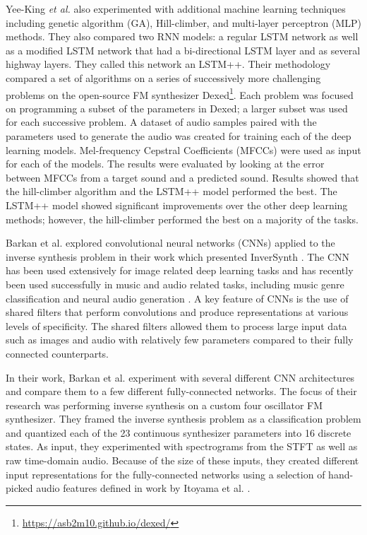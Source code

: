 Yee-King \textit{et al.} also experimented with additional machine learning techniques including genetic algorithm (GA), Hill-climber, and  multi-layer perceptron (MLP) methods. They also compared two RNN models: a regular LSTM network as well as a modified LSTM network that had a bi-directional LSTM layer and as several highway layers. They called this network an LSTM++. Their methodology compared a set of algorithms on a series of successively more challenging problems on the open-source FM synthesizer Dexed\footnote{\url{https://asb2m10.github.io/dexed/}}. Each problem was focused on programming a subset of the parameters in Dexed; a larger subset was used for each successive problem. A dataset of audio samples paired with the parameters used to generate the audio was created for training each of the deep learning models. Mel-frequency Cepstral Coefficients (MFCCs) were used as input for each of the models. The results were evaluated by looking at the error between MFCCs from a target sound and a predicted sound. Results showed that the hill-climber algorithm and the LSTM++ model performed the best. The LSTM++ model showed significant improvements over the other deep learning methods; however, the hill-climber performed the best on a majority of the tasks.

Barkan et al. explored convolutional neural networks (CNNs) applied to the inverse synthesis problem in their work which presented InverSynth \cite{barkan2019deep}. The CNN has been used extensively for image related deep learning tasks and has recently been used successfully in music and audio related tasks, including music genre classification \cite{choi2016automatic} and neural audio generation \cite{donahue2018adversarial}. A key feature of CNNs is the use of shared filters that perform convolutions and produce representations at various levels of specificity. The shared filters allowed them to process large input data such as images and audio with relatively few parameters compared to their fully connected counterparts. 

In their work, Barkan et al. experiment with several different CNN architectures and compare them to a few different fully-connected networks. The focus of their research was performing inverse synthesis on a custom four oscillator FM synthesizer. They framed the inverse synthesis problem as a classification problem and quantized each of the 23 continuous synthesizer parameters into 16 discrete states. As input, they experimented with spectrograms from the STFT as well as raw time-domain audio. Because of the size of these inputs, they created different input representations for the fully-connected networks using a selection of hand-picked audio features defined in work by Itoyama et al. \cite{itoyama2014parameter}.

